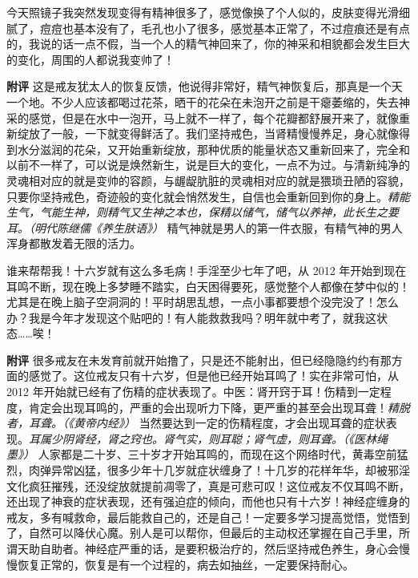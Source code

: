 \begin{case}
    今天照镜子我突然发现变得有精神很多了，感觉像换了个人似的，皮肤变得光滑细腻了，痘痘也基本没有了，毛孔也小了很多，感觉基本正常了，不过痘痕还是有点的，我说的话一点不假，当一个人的精气神回来了，你的神采和相貌都会发生巨大的变化，周围的人都说我变帅了！

    \textbf{附评} 这是戒友犹太人的恢复反馈，他说得非常好，精气神恢复后，那真是一个天一个地。不少人应该都喝过花茶，晒干的花朵在未泡开之前是干瘪萎缩的，失去神采的感觉，但是在水中一泡开，马上就不一样了，每个花瓣都舒展开来了，就像重新绽放了一般，一下就变得鲜活了。我们坚持戒色，当肾精慢慢养足，身心就像得到水分滋润的花朵，又开始重新绽放，那种优质的能量状态又重新回来了，完全和以前不一样了，可以说是焕然新生，说是巨大的变化，一点不为过。与清新纯净的灵魂相对应的就是变帅的容颜，与龌龊肮脏的灵魂相对应的就是猥琐丑陋的容貌，只要你坚持戒色，奇迹般的变化就会悄然发生，自信也会重新回到你的身上。\textit{精能生气，气能生神，则精气又生神之本也，保精以储气，储气以养神，此长生之要耳。（明代陈继儒《养生肤语》）} 精气神就是男人的第一件衣服，有精气神的男人浑身都散发着无限的活力。
\end{case}

\begin{case}
    谁来帮帮我！十六岁就有这么多毛病！手淫至少七年了吧，从 2012 年开始到现在耳鸣不断，现在晚上多梦睡不踏实，白天困得要死，感觉整个人都像在梦中似的！尤其是在晚上脑子空洞洞的！平时胡思乱想，一点小事都要想个没完没了！怎么办？我是今年才发现这个贴吧的！有人能救救我吗？明年就中考了，就我这状态……唉！

    \textbf{附评} 很多戒友在未发育前就开始撸了，只是还不能射出，但已经隐隐约约有那方面的感觉了。这位戒友只有十六岁，但是他已经开始耳鸣了！实在非常可怕，从 2012 年开始就已经有了伤精的症状表现了。中医：肾开窍于耳！伤精到一定程度，肯定会出现耳鸣的，严重的会出现听力下降，更严重的甚至会出现耳聋！\textit{精脱者，耳聋。（《黄帝内经》）} 当然要达到一定的伤精程度，才会出现耳聋的症状表现。\textit{耳属少阴肾经，肾之窍也。肾气实，则耳聪；肾气虚，则耳聋。（《医林绳墨》）} 人家都是二十岁、三十岁才开始耳鸣的，而现在这个网络时代，黄毒空前猛烈，肉弹异常凶猛，很多少年十几岁就症状缠身了！十几岁的花样年华，却被邪淫文化疯狂摧残，还没绽放就提前凋零了，真是可悲可叹！这位戒友不仅耳鸣不断，还出现了神衰的症状表现，还有强迫症的倾向，而他也只有十六岁！神经症缠身的戒友，多有喊救命，最后能救自己的，还是自己！一定要多学习提高觉悟，觉悟到了，自然可以降伏心魔。别人是可以帮你，但最后的主动权还掌握在自己手里，所谓天助自助者。神经症严重的话，是要积极治疗的，然后坚持戒色养生，身心会慢慢恢复正常的，恢复是有一个过程的，病去如抽丝，一定要保持耐心。
\end{case}

